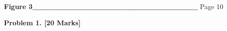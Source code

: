 \documentclass[12pt]{article}
\begin{document}
\textbf{Figure 3\_\_\_\_\_\_\_\_\_\_\_\_\_\_\_\_\_\_\_\_\_\_\_\_\_\_\_\_ }Page 10\par


\vspace{\baselineskip}

\vspace{\baselineskip}

\vspace{\baselineskip}

\vspace{\baselineskip}

\vspace{\baselineskip}

\vspace{\baselineskip}

\vspace{\baselineskip}

\vspace{\baselineskip}

\vspace{\baselineskip}

\vspace{\baselineskip}

\vspace{\baselineskip}

\vspace{\baselineskip}

\vspace{\baselineskip}

\vspace{\baselineskip}

\vspace{\baselineskip}

\vspace{\baselineskip}

\vspace{\baselineskip}

\vspace{\baselineskip}

\vspace{\baselineskip}

\vspace{\baselineskip}

\vspace{\baselineskip}

\vspace{\baselineskip}

\vspace{\baselineskip}

\vspace{\baselineskip}
\textbf{Problem 1. [20 Marks]}\par
\end{document}
